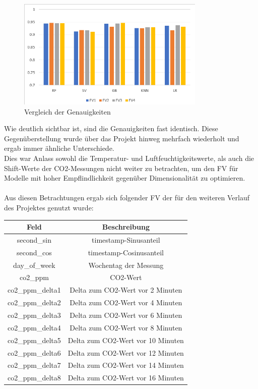 \begin{figure}[h]
    \centering
    \includegraphics[width=0.8\textwidth]{pic/FV_comp.png}
    \caption{Vergleich der Genauigkeiten}
    \label{fig:FIB}
\end{figure}

Wie deutlich sichtbar ist, sind die Genauigkeiten fast identisch. Diese Gegenüberstellung wurde über das Projekt
hinweg mehrfach wiederholt und ergab immer ähnliche Unterschiede.\\
Dies war Anlass sowohl die Temperatur- und Luftfeuchtigkeitswerte, als auch die Shift-Werte der CO2-Messungen 
nicht weiter zu betrachten, um den FV für Modelle mit hoher Empflindlichkeit gegenüber Dimensionalität zu 
optimieren.\\\\
\newpage
Aus diesen Betrachtungen ergab sich folgender FV der für den weiteren Verlauf des Projektes genutzt wurde:\\

\begin{center}
    \begin{tabular}{ |c||c| } 
     \hline
     Feld & Beschreibung \\ 
     \hline\hline
     second\_sin & timestamp-Sinusanteil\\
     second\_cos & timestamp-Cosinusanteil\\
     day\_of\_week & Wochentag der Messung\\
     co2\_ppm & CO2-Wert\\ 
     co2\_ppm\_delta1 & Delta zum CO2-Wert vor 2 Minuten\\ 
     co2\_ppm\_delta2 & Delta zum CO2-Wert vor 4 Minuten\\ 
     co2\_ppm\_delta3 & Delta zum CO2-Wert vor 6 Minuten\\ 
     co2\_ppm\_delta4 & Delta zum CO2-Wert vor 8 Minuten\\ 
     co2\_ppm\_delta5 & Delta zum CO2-Wert vor 10 Minuten\\ 
     co2\_ppm\_delta6 & Delta zum CO2-Wert vor 12 Minuten\\ 
     co2\_ppm\_delta7 & Delta zum CO2-Wert vor 14 Minuten\\ 
     co2\_ppm\_delta8 & Delta zum CO2-Wert vor 16 Minuten\\ 
     \hline
    \end{tabular}
\end{center}


